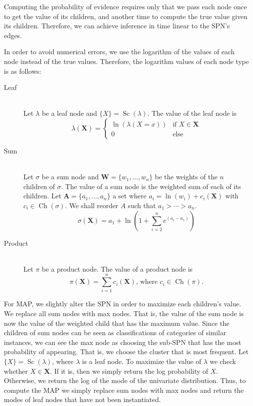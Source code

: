 \documentclass{amsart}
\DeclareMathOperator*{\Ch}{\text{Ch}}
\DeclareMathOperator*{\Sc}{\text{Sc}}
\theoremstyle{plain}
\numberwithin{equation}{section}
\newcommand{\set}[1]{\mathbf{#1}}
\begin{document}
Computing the probability of evidence requires only that we pass each node once to get the value of
its children, and another time to compute the true value given its children. Therefore, we can
achieve inference in time linear to the SPN's edges.

In order to avoid numerical errors, we use the logarithm of the values of each node instead of the
true values. Therefore, the logarithm values of each node type is as follows:

\begin{description}
  \item[Leaf]~\\
    Let $\lambda$ be a leaf node and $\{X\}=\Sc(\lambda)$. The value of the leaf node is
    \begin{equation*}
      \lambda(\set{X})=
      \begin{cases}
        \ln(\lambda(X=x)) & \text{if } X\in\set{X}\\
        0 & \text{else}
      \end{cases}
    \end{equation*}
  \item[Sum]~\\
    Let $\sigma$ be a sum node and $\set{W}=\{w_1,\ldots,w_n\}$ be the weights of the $n$ children
    of $\sigma$. The value of a sum node is the weighted sum of each of its children. Let $\set{A}=
    \{a_1,\ldots, a_n\}$ a set where $a_i=\ln(w_i)+c_i(\set{X})$ with $c_i\in\Ch(\sigma)$. We shall
    reorder $A$ such that $a_1>\cdots>a_n$.
    \begin{equation*}
      \sigma(\set{X})=a_1+\ln\left(1+\sum_{i=2}^n e^{\left(a_i - a_1\right)}\right)
    \end{equation*}
  \item[Product]~\\
    Let $\pi$ be a product node. The value of a product node is
    \begin{equation*}
      \pi(\set{X})=\sum_{i=1}^n c_i(\set{X})\text{, where $c_i\in\Ch(\pi)$.}
    \end{equation*}
\end{description}

For MAP, we slightly alter the SPN in order to maximize each children's value. We replace all sum
nodes with max nodes. That is, the value of the sum node is now the value of the weighted child
that has the maximum value. Since the children of sum nodes can be seen as classifications of
categories of similar instances, we can see the max node as choosing the sub-SPN that has the most
probability of appearing. That is, we choose the cluster that is most frequent. Let
$\{X\}=\Sc(\lambda)$, where $\lambda$ is a leaf node. To maximize the value of $\lambda$ we check
whether $X\in\set{X}$. If it is, then we simply return the log probability of $X$. Otherwise, we
return the log of the mode of the univariate distribution. Thus, to compute the MAP we simply
replace sum nodes with max nodes and return the modes of leaf nodes that have not been
instantiated.
\end{document}
